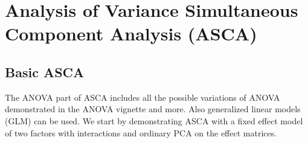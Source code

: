 \section{Analysis of Variance Simultaneous Component Analysis
(ASCA)}\label{analysis-of-variance-simultaneous-component-analysis-asca}

\subsection{Basic ASCA}\label{basic-asca}

The ANOVA part of ASCA includes all the possible variations of ANOVA
demonstrated in the ANOVA vignette and more. Also generalized linear
models (GLM) can be used. We start by demonstrating ASCA with a fixed
effect model of two factors with interactions and ordinary PCA on the
effect matrices.

